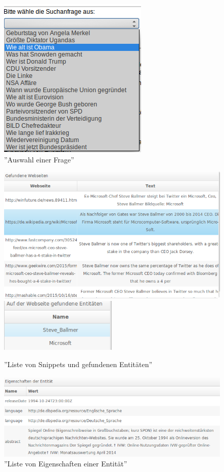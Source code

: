 \begin{figure}
\centering
\includegraphics[width=.6\textwidth]{Bilder/select-question.png}
\caption{''Auswahl einer Frage''}
\label{fig:eval-select-question}
\end{figure}

\begin{figure}
\centering
\includegraphics[width=1\textwidth]{Bilder/evalstep02-step1.png}
\includegraphics[width=0.5\textwidth]{Bilder/evalstep02-step1-2.png}
\caption{''Liste von Snippets und gefundenen Entitäten''}
\label{fig:eval-entitylist}
\end{figure}

\begin{figure}
\centering
\includegraphics[width=1\textwidth]{Bilder/eval-step03.png}
\caption{''Liste von Eigenschaften einer Entität''}
\label{fig:eval-props}
\end{figure}

